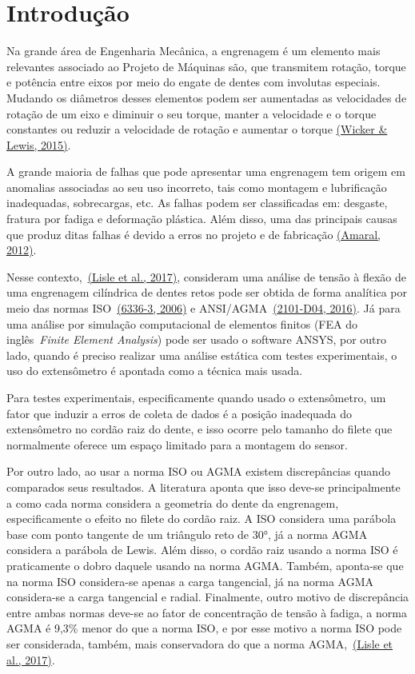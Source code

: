 \documentclass[12pt,a4paper]{article}
\begin{document}
\newpage

\sloppy

\section*{Introdução}

{\label{introduuxe7uxe3o}}

Na grande área de Engenharia Mecânica, a engrenagem é um elemento mais
relevantes associado ao Projeto de Máquinas são, que transmitem rotação,
torque e potência entre eixos por meio do engate de dentes com involutas
especiais. Mudando os diâmetros desses elementos podem ser aumentadas as
velocidades de rotação de um eixo e diminuir o seu torque, manter a
velocidade e o torque constantes ou reduzir a velocidade de rotação e
aumentar o torque \hyperref[csl:1]{(Wicker \& Lewis, 2015)}.

A grande maioria de falhas que pode apresentar uma engrenagem tem origem
em anomalias associadas ao seu uso incorreto, tais como montagem e
lubrificação inadequadas, sobrecargas, etc. As falhas podem ser
classificadas em: desgaste, fratura por fadiga e deformação plástica.
Além disso, uma das principais causas que produz ditas falhas é devido a
erros no projeto e de fabricação \hyperref[csl:2]{(Amaral, 2012)}.

Nesse contexto,~\hyperref[csl:3]{(Lisle et al., 2017)}, consideram uma análise de tensão à
flexão de uma engrenagem cilíndrica de dentes retos pode ser obtida de
forma analítica por meio das normas ISO~\hyperref[csl:4]{(6336-3, 2006)} e
ANSI/AGMA~\hyperref[csl:5]{(2101-D04, 2016)}. Já para uma análise por simulação
computacional de elementos finitos (FEA do inglês~\emph{Finite Element
Analysis}) pode ser usado o software ANSYS, por outro lado, quando é
preciso realizar uma análise estática com testes experimentais, o uso do
extensômetro é apontada como a técnica mais usada.

Para testes experimentais, especificamente quando usado o extensômetro,
um fator que induzir a erros de coleta de dados é a posição inadequada
do extensômetro no cordão raiz do dente, e isso ocorre pelo tamanho do
filete que normalmente oferece um espaço limitado para a montagem do
sensor.

Por outro lado, ao usar a norma ISO ou AGMA existem discrepâncias quando
comparados seus resultados. A literatura aponta que isso deve-se
principalmente a como cada norma considera a geometria do dente da
engrenagem, especificamente o efeito no filete do cordão raiz. A ISO
considera uma parábola base com ponto tangente de um triângulo reto de
30°, já a norma AGMA considera a parábola de Lewis. Além disso, o cordão
raiz usando a norma ISO é praticamente o dobro daquele usando na norma
AGMA. Também, aponta-se que na norma ISO considera-se apenas a carga
tangencial, já na norma AGMA considera-se a carga tangencial e radial.
Finalmente, outro motivo de discrepância entre ambas normas deve-se ao
fator de concentração de tensão à fadiga, a norma AGMA é 9,3\% menor do
que a norma ISO, e por esse motivo a norma ISO pode ser considerada,
também, mais conservadora do que a norma AGMA,~\hyperref[csl:3]{(Lisle et al., 2017)}.
\end{document}
